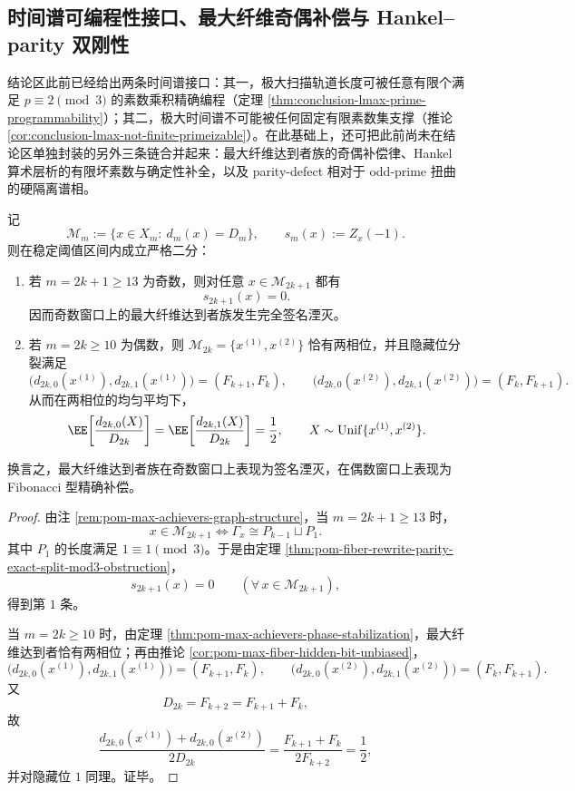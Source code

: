 \subsection{时间谱可编程性接口、最大纤维奇偶补偿与 Hankel--parity 双刚性}\label{subsec:conclusion-timespectrum-maxfiber-hankel-stiffness-parityphase}
结论区此前已经给出两条时间谱接口：其一，极大扫描轨道长度可被任意有限个满足 \(p\equiv 2\pmod 3\) 的素数乘积精确编程（定理 \ref{thm:conclusion-lmax-prime-programmability}）；其二，极大时间谱不可能被任何固定有限素数集支撑（推论 \ref{cor:conclusion-lmax-not-finite-primeizable}）。在此基础上，还可把此前尚未在结论区单独封装的另外三条链合并起来：最大纤维达到者族的奇偶补偿律、Hankel 算术层析的有限坏素数与确定性补全，以及 parity-defect 相对于 odd-prime 扭曲的硬隔离谱相。

\begin{theorem}[最大纤维达到者族的奇偶补偿律]\label{thm:conclusion-maxfiber-achievers-odd-even-compensation}
记
\[
\mathcal M_m:=\{x\in X_m:\ d_m(x)=D_m\},
\qquad
s_m(x):=Z_x(-1).
\]
则在稳定阈值区间内成立严格二分：
\begin{enumerate}
  \item 若 \(m=2k+1\ge 13\) 为奇数，则对任意 \(x\in \mathcal M_{2k+1}\) 都有
  \[
  s_{2k+1}(x)=0.
  \]
  因而奇数窗口上的最大纤维达到者族发生完全签名湮灭。
  \item 若 \(m=2k\ge 10\) 为偶数，则 \(\mathcal M_{2k}=\{x^{(1)},x^{(2)}\}\) 恰有两相位，并且隐藏位分裂满足
  \[
  \bigl(d_{2k,0}(x^{(1)}),d_{2k,1}(x^{(1)})\bigr)=(F_{k+1},F_k),
  \qquad
  \bigl(d_{2k,0}(x^{(2)}),d_{2k,1}(x^{(2)})\bigr)=(F_k,F_{k+1}).
  \]
  从而在两相位的均匀平均下，
  \[
  \EE\!\left[\frac{d_{2k,0}(X)}{D_{2k}}\right]
  =
  \EE\!\left[\frac{d_{2k,1}(X)}{D_{2k}}\right]
  =\frac12,
  \qquad
  X\sim \mathrm{Unif}\{x^{(1)},x^{(2)}\}.
  \]
\end{enumerate}
换言之，最大纤维达到者族在奇数窗口上表现为签名湮灭，在偶数窗口上表现为 Fibonacci 型精确补偿。
\end{theorem}

\begin{proof}
由注 \ref{rem:pom-max-achievers-graph-structure}，当 \(m=2k+1\ge 13\) 时，
\[
x\in \mathcal M_{2k+1}
\iff
\Gamma_x\cong P_{k-1}\sqcup P_1.
\]
其中 \(P_1\) 的长度满足 \(1\equiv 1\pmod 3\)。于是由定理 \ref{thm:pom-fiber-rewrite-parity-exact-split-mod3-obstruction}，
\[
s_{2k+1}(x)=0
\qquad
(\forall\,x\in \mathcal M_{2k+1}),
\]
得到第 \(1\) 条。

当 \(m=2k\ge 10\) 时，由定理 \ref{thm:pom-max-achievers-phase-stabilization}，最大纤维达到者恰有两相位；再由推论 \ref{cor:pom-max-fiber-hidden-bit-unbiased}，
\[
\bigl(d_{2k,0}(x^{(1)}),d_{2k,1}(x^{(1)})\bigr)=(F_{k+1},F_k),
\qquad
\bigl(d_{2k,0}(x^{(2)}),d_{2k,1}(x^{(2)})\bigr)=(F_k,F_{k+1}).
\]
又
\[
D_{2k}=F_{k+2}=F_{k+1}+F_k,
\]
故
\[
\frac{d_{2k,0}(x^{(1)})+d_{2k,0}(x^{(2)})}{2D_{2k}}
=
\frac{F_{k+1}+F_k}{2F_{k+2}}
=\frac12,
\]
并对隐藏位 \(1\) 同理。证毕。
\end{proof}

